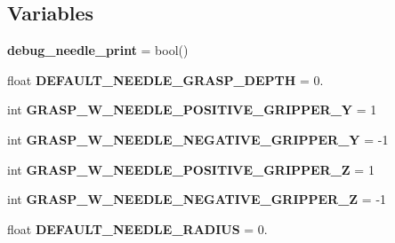 \subsection*{Variables}
\begin{DoxyCompactItemize}
\item 
{\bfseries debug\+\_\+needle\+\_\+print} = bool(\textquotesingle{}\textquotesingle{})\hypertarget{namespaceneedle__planner__gripper__working_ab7510c7195b9340785ac2462590514a5}{}\label{namespaceneedle__planner__gripper__working_ab7510c7195b9340785ac2462590514a5}

\item 
float {\bfseries D\+E\+F\+A\+U\+L\+T\+\_\+\+N\+E\+E\+D\+L\+E\+\_\+\+G\+R\+A\+S\+P\+\_\+\+D\+E\+P\+TH} = 0.\hypertarget{namespaceneedle__planner__gripper__working_af85ce4c04c2345af91bfbeceae89ff42}{}\label{namespaceneedle__planner__gripper__working_af85ce4c04c2345af91bfbeceae89ff42}

\item 
int {\bfseries G\+R\+A\+S\+P\+\_\+\+W\+\_\+\+N\+E\+E\+D\+L\+E\+\_\+\+P\+O\+S\+I\+T\+I\+V\+E\+\_\+\+G\+R\+I\+P\+P\+E\+R\+\_\+Y} = 1\hypertarget{namespaceneedle__planner__gripper__working_ab38003ffe0f5699a6fbaa169edb0ef0e}{}\label{namespaceneedle__planner__gripper__working_ab38003ffe0f5699a6fbaa169edb0ef0e}

\item 
int {\bfseries G\+R\+A\+S\+P\+\_\+\+W\+\_\+\+N\+E\+E\+D\+L\+E\+\_\+\+N\+E\+G\+A\+T\+I\+V\+E\+\_\+\+G\+R\+I\+P\+P\+E\+R\+\_\+Y} = -\/1\hypertarget{namespaceneedle__planner__gripper__working_adf730c27701872c4beef8953b283dd99}{}\label{namespaceneedle__planner__gripper__working_adf730c27701872c4beef8953b283dd99}

\item 
int {\bfseries G\+R\+A\+S\+P\+\_\+\+W\+\_\+\+N\+E\+E\+D\+L\+E\+\_\+\+P\+O\+S\+I\+T\+I\+V\+E\+\_\+\+G\+R\+I\+P\+P\+E\+R\+\_\+Z} = 1\hypertarget{namespaceneedle__planner__gripper__working_a2c07e2dc387e380f4266777ec5cb7e76}{}\label{namespaceneedle__planner__gripper__working_a2c07e2dc387e380f4266777ec5cb7e76}

\item 
int {\bfseries G\+R\+A\+S\+P\+\_\+\+W\+\_\+\+N\+E\+E\+D\+L\+E\+\_\+\+N\+E\+G\+A\+T\+I\+V\+E\+\_\+\+G\+R\+I\+P\+P\+E\+R\+\_\+Z} = -\/1\hypertarget{namespaceneedle__planner__gripper__working_a55bb988a1602b62ce9e81fd7e9ed561e}{}\label{namespaceneedle__planner__gripper__working_a55bb988a1602b62ce9e81fd7e9ed561e}

\item 
float {\bfseries D\+E\+F\+A\+U\+L\+T\+\_\+\+N\+E\+E\+D\+L\+E\+\_\+\+R\+A\+D\+I\+US} = 0.\hypertarget{namespaceneedle__planner__gripper__working_a5cfd8d7c550e4935a9b4c7ae0b10dc28}{}\label{namespaceneedle__planner__gripper__working_a5cfd8d7c550e4935a9b4c7ae0b10dc28}


\end{DoxyCompactItemize}
